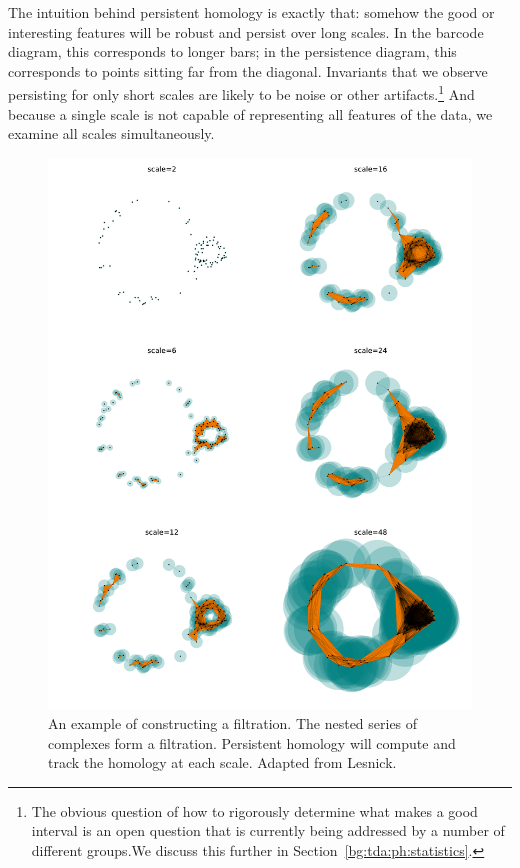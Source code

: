 The intuition behind persistent homology is exactly that: somehow the good or interesting features will be robust and persist over long scales.
In the barcode diagram, this corresponds to longer bars; in the persistence diagram, this corresponds to points sitting far from the diagonal.
Invariants that we observe persisting for only short scales are likely to be noise or other artifacts.\footnote{The obvious question of how to rigorously determine what makes a good interval is an open question that is currently being addressed by a number of different groups.We discuss this further in Section~\ref{bg:tda:ph:statistics}.}
And because a single scale is not capable of representing all features of the data, we examine all scales simultaneously.

\begin{figure}
\centering
\includegraphics[width=\textwidth]{./fig/background/expanding_balls.pdf}
\caption[Multiscale Topological Structure]{An example of constructing a filtration. The nested series of complexes form a filtration. Persistent homology will compute and track the homology at each scale. Adapted from Lesnick.}
\label{fig:bg:expanding_balls}
\end{figure}


